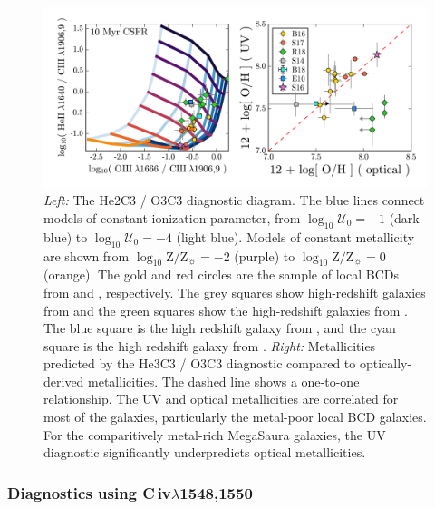 \documentclass[preprint2]{aastex62}
\newcommand{\civ}{C\,{\sc iv}\xspace}
\newcommand{\logten}{\ensuremath{\log_{10}}}
\newcommand{\logZeq}[1]{\ensuremath{\logten \mathrm{Z}/\mathrm{Z}_{\sun} = #1}}
\newcommand{\logUeq}[1]{\ensuremath{\logten \mathcal{U}_0 = #1}}
\newcommand{\mage}{{\sc Meg}a{\sc S}a{\sc ura}\xspace}
\begin{document}
\begin{figure}
  \begin{center}
    \includegraphics[width=\linewidth]{figs/f4.png}
    \caption{\emph{Left:} The He2C3 / O3C3 diagnostic diagram.  The blue lines connect models of constant ionization parameter, from \logUeq{-1} (dark blue) to \logUeq{-4} (light blue). Models of constant metallicity are shown from \logZeq{-2} (purple) to \logZeq{0} (orange). The gold and red circles are the sample of local BCDs from \citet{Berg+2016} and \citet{Senchyna+2017}, respectively. The grey squares show high-redshift galaxies from \citet{Stark+2014} and the green squares show the high-redshift galaxies from \citet{Rigby+2018b}. The blue square is the high redshift galaxy from \citet{Erb+2010}, and the cyan square is the high redshift galaxy from \citet{Berg+2018}. \emph{Right:} Metallicities predicted by the He3C3 / O3C3 diagnostic compared to optically-derived metallicities. The dashed line shows a one-to-one relationship. The UV and optical metallicities are correlated for most of the galaxies, particularly the metal-poor local BCD galaxies. For the comparitively metal-rich \mage galaxies, the UV diagnostic significantly underpredicts optical metallicities.}
    \label{fig:UVHe}
  \end{center}
\end{figure}

\subsubsection{Diagnostics using \civ$\lambda$1548,1550}\label{sec:UVOpt:CIV}
\end{document}
